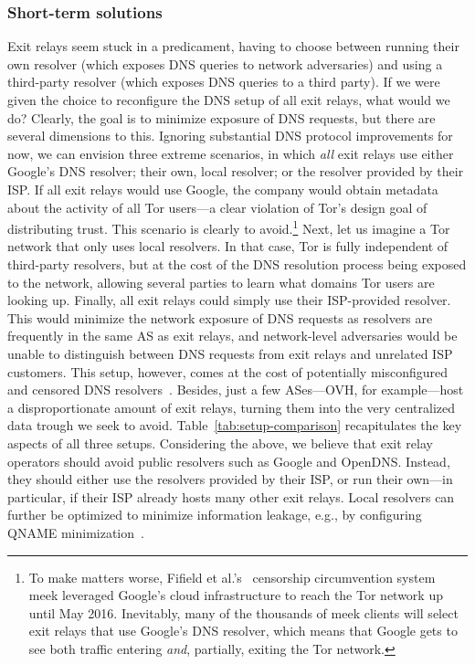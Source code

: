 \subsubsection{Short-term solutions}
\label{sec:short-term}
Exit relays seem stuck in a predicament, having to choose between running their
own resolver (which exposes DNS queries to network adversaries) and using a
third-party resolver (which exposes DNS queries to a third party).  If we were
given the choice to reconfigure the DNS setup of all exit relays, what would we
do?  Clearly, the goal is to minimize exposure of DNS requests, but there are
several dimensions to this.  Ignoring substantial DNS protocol improvements for
now, we can envision three extreme scenarios, in which \emph{all} exit relays
use either \first Google's DNS resolver; \second their own, local resolver; or
\third the resolver provided by their ISP.  If all exit relays would use Google,
the company would obtain metadata about the activity of all Tor users---a clear
violation of Tor's design goal of distributing trust.  This scenario is clearly
to avoid.\footnote{To make matters worse, Fifield et al.'s~\cite{Fifield2015a}
censorship circumvention system meek leveraged Google's cloud infrastructure
to reach the Tor network up until May 2016.
Inevitably, many of the thousands of meek clients
will select exit relays that use Google's DNS resolver, which means that Google
gets to see both traffic entering \emph{and}, partially, exiting the Tor
network.} Next, let us imagine a Tor network that only uses local resolvers.  In
that case, Tor is fully independent of third-party resolvers, but at the cost of
the DNS resolution process being exposed to the network, allowing several
parties to learn what domains Tor users are looking up.  Finally, all exit
relays could simply use their ISP-provided resolver.  This would minimize the
network exposure of DNS requests as resolvers are frequently in the same AS as
exit relays, and network-level adversaries would be unable to distinguish
between DNS requests from exit relays and unrelated ISP customers.  This setup,
however, comes at the cost of potentially misconfigured and censored DNS
resolvers~\cite[\S~4.1]{Winter2014b}.  Besides, just a few ASes---OVH, for
example---host a disproportionate amount of exit relays, turning them into the
very centralized data trough we seek to avoid.  Table~\ref{tab:setup-comparison}
recapitulates the key aspects of all three setups.  Considering the above, we
believe that exit relay operators should avoid public resolvers such as Google
and OpenDNS.  Instead, they should either use the resolvers provided by their
ISP, or run their own---in particular, if their ISP already hosts many other
exit relays.  Local resolvers can further be optimized to minimize information
leakage, e.g., by configuring QNAME minimization~\cite{qname-minimization}.

